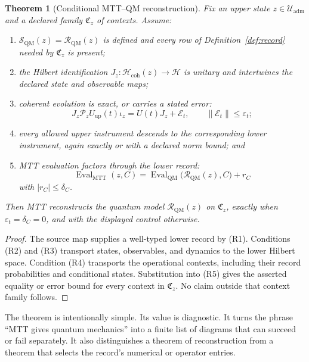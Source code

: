 \documentclass[11pt]{article}
\newtheorem{theorem}{Theorem}[section]
\theoremstyle{definition}
\theoremstyle{remark}
\newcommand{\cE}{\mathcal E}
\newcommand{\cH}{\mathcal H}
\newcommand{\cP}{\mathcal P}
\newcommand{\cR}{\mathcal R}
\newcommand{\cS}{\mathcal S}
\newcommand{\cU}{\mathcal U}
\let\MTToriginalitem\item
\renewcommand{\item}{\par\MTToriginalitem}
\begin{document}
\begin{theorem}[Conditional MTT--QM reconstruction]
\label{thm:conditional}
Fix an upper state \(z\in\cU_{\mathrm{adm}}\) and a declared family
\(\mathfrak C_z\) of contexts.  Assume:
\begin{enumerate}[label=(R\arabic*),leftmargin=2.8em]
\item \(\cS_{\mathrm{QM}}(z)=\cR_{\mathrm{QM}}(z)\) is defined and every row
      of Definition~\ref{def:record} needed by \(\mathfrak C_z\) is present;
\item the Hilbert identification
      \(J_z\colon\cH_{\mathrm{coh}}(z)\to\cH\) is unitary and intertwines the
      declared state and observable maps;
\item coherent evolution is exact, or carries a stated error:
      \[
      J_z\cP_zU_{\mathrm{up}}(t)\iota_z
      =
      U(t)J_z+\cE_t,
      \qquad \|\cE_t\|\leq\varepsilon_t;
      \]
\item every allowed upper instrument descends to the corresponding lower
      instrument, again exactly or with a declared norm bound; and
\item MTT evaluation factors through the lower record:
      \[
      \operatorname{Eval}_{\mathrm{MTT}}(z,C)
      =
      \operatorname{Eval}_{\mathrm{QM}}
      \bigl(\cR_{\mathrm{QM}}(z),C\bigr)+r_C
      \]
      with \(|r_C|\leq\delta_C\).
\end{enumerate}
Then MTT reconstructs the quantum model
\(\cR_{\mathrm{QM}}(z)\) on \(\mathfrak C_z\), exactly when
\(\varepsilon_t=\delta_C=0\), and with the displayed control otherwise.
\end{theorem}

\begin{proof}
The source map supplies a well-typed lower record by (R1).  Conditions (R2)
and (R3) transport states, observables, and dynamics to the lower Hilbert
space.  Condition (R4) transports the operational contexts, including their
record probabilities and conditional states.  Substitution into (R5) gives
the asserted equality or error bound for every context in
\(\mathfrak C_z\).  No claim outside that context family follows.
\end{proof}

The theorem is intentionally simple.  Its value is diagnostic.  It turns the
phrase ``MTT gives quantum mechanics'' into a finite list of diagrams that
can succeed or fail separately.  It also distinguishes a theorem of
reconstruction from a theorem that selects the record's numerical or
operator entries.
\end{document}
